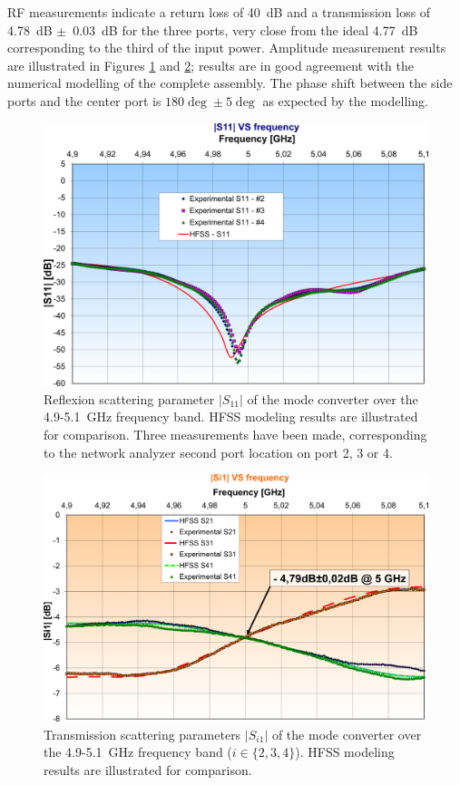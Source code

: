 RF measurements indicate a return loss of 40~dB and a transmission loss of 4.78~dB $\pm$~0.03~dB for the three ports, very close from the ideal 4.77~dB corresponding to the third of the input power. Amplitude measurement results are illustrated in Figures \ref{fig:ModeConverter_S11} and \ref{fig:ModeConverter_S21}; results are in good agreement with the numerical modelling of the complete assembly. The phase shift between the side ports and the center port is $180\deg\pm5\deg$ as expected by the modelling. 

\begin{figure}
	\centering
	\includegraphics[width=1.0\textwidth]{figures/chap3/ITER_modeconverter/LH4ITER_ModeConverter_S11}
	\caption{Reflexion scattering parameter $|S_{11}|$ of the mode converter over the 4.9-5.1~GHz frequency band. HFSS modeling results are illustrated for comparison. Three measurements have been made, corresponding to the network analyzer second port location on port 2, 3 or 4.}
	\label{fig:ModeConverter_S11}
\end{figure}

\begin{figure}
	\centering
	\includegraphics[width=1.0\textwidth]{figures/chap3/ITER_modeconverter/LH4ITER_ModeConverter_S21}
	\caption{Transmission scattering parameters $|S_{i1}|$ of the mode converter over the 4.9-5.1~GHz frequency band ($i \in \{2,3,4\}$). HFSS modeling results are illustrated for comparison.}
	\label{fig:ModeConverter_S21}
\end{figure}


